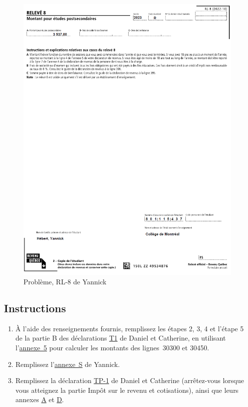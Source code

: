 \begin{figure}
	\centering
	\includegraphics[width=.9\textwidth]{probleme/chapitre-4/Yannick-RL8.png}
	\caption{Problème, RL-8 de Yannick}
	\label{fig:chap4ProblemeYannickRL8}
\end{figure}


\subsection{Instructions}
\begin{enumerate}
	\item À l'aide des renseignements fournis, remplissez les étapes 2, 3, 4 et l'étape 5 de la partie B des déclarations \href{https://www.canada.ca/fr/agence-revenu/services/formulaires-publications/trousses-impot-toutes-annees-imposition/trousse-generale-impot-prestations/quebec/5005-r.html}{T1} de Daniel et Catherine, en utilisant l'\href{https://www.canada.ca/fr/agence-revenu/services/formulaires-publications/trousses-impot-toutes-annees-imposition/trousse-generale-impot-prestations/5000-s5.html}{annexe~5} pour calculer les montants des lignes~30300 et 30450.
	\item Remplissez l'\href{https://www.revenuquebec.ca/documents/fr/formulaires/tp/2023-12/TP-1.D.S%282023-12%29.pdf}{annexe~S} de Yannick.
	\item Remplissez la déclaration \href{https://www.revenuquebec.ca/documents/fr/formulaires/tp/2023-12/TP-1.D%282023-12%29.pdf}{TP-1} de Daniel et Catherine (arrêtez-vous lorsque vous atteignez la partie Impôt sur le revenu et cotisations), ainsi que leurs annexes \href{https://www.revenuquebec.ca/documents/fr/formulaires/tp/2023-12/TP-1.D.A%282023-12%29.pdf}{A} et \href{https://www.revenuquebec.ca/documents/fr/formulaires/tp/2023-12/TP-1.D.D%282023-12%29.pdf}{D}.
\end{enumerate}